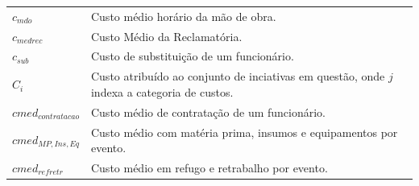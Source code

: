 \documentclass[]{article}
\begin{document}
\begin{longtable}[]{@{}ll@{}}
\begin{minipage}[t]{0.07\columnwidth}
\(c_{mdo}\)\strut
\end{minipage} & \begin{minipage}[t]{0.87\columnwidth}\raggedright\strut
Custo médio horário da mão de obra.\strut
\end{minipage}\tabularnewline
\begin{minipage}[t]{0.07\columnwidth}\raggedright\strut
\(c_{medrec}\)\strut
\end{minipage} & \begin{minipage}[t]{0.87\columnwidth}\raggedright\strut
Custo Médio da Reclamatória.\strut
\end{minipage}\tabularnewline
\begin{minipage}[t]{0.07\columnwidth}\raggedright\strut
\(c_{sub}\)\strut
\end{minipage} & \begin{minipage}[t]{0.87\columnwidth}\raggedright\strut
Custo de substituição de um funcionário.\strut
\end{minipage}\tabularnewline
\begin{minipage}[t]{0.07\columnwidth}\raggedright\strut
\(C_i\)\strut
\end{minipage} & \begin{minipage}[t]{0.87\columnwidth}\raggedright\strut
Custo atribuído ao conjunto de inciativas em questão, onde \(j\) indexa
a categoria de custos.\strut
\end{minipage}\tabularnewline
\begin{minipage}[t]{0.07\columnwidth}\raggedright\strut
\(cmed_{contratacao}\)\strut
\end{minipage} & \begin{minipage}[t]{0.87\columnwidth}\raggedright\strut
Custo médio de contratação de um funcionário.\strut
\end{minipage}\tabularnewline
\begin{minipage}[t]{0.07\columnwidth}\raggedright\strut
\(cmed_{MP, Ins, Eq}\)\strut
\end{minipage} & \begin{minipage}[t]{0.87\columnwidth}\raggedright\strut
Custo médio com matéria prima, insumos e equipamentos por evento.\strut
\end{minipage}\tabularnewline
\begin{minipage}[t]{0.07\columnwidth}\raggedright\strut
\(cmed_{refretr}\)\strut
\end{minipage} & \begin{minipage}[t]{0.87\columnwidth}\raggedright\strut
Custo médio em refugo e retrabalho por evento.\strut

\end{minipage}
\end{longtable}
\end{document}
